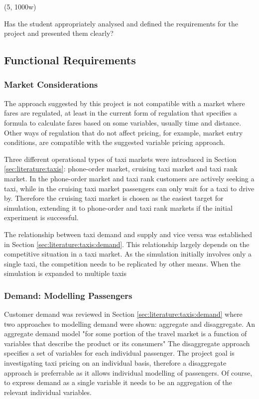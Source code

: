 (5, 1000w)

Has the student appropriately analysed and defined the requirements for the
project and presented them clearly?


\subsection{Functional Requirements}
\label{sec:requirements:simulation}

\subsubsection{Market Considerations}

The approach suggested by this project is not compatible with a market where
fares are regulated, at least in the current form of regulation that specifies
a formula to calculate fares based on some variables, usually time and
distance. Other ways of regulation that do not affect pricing, for example,
market entry conditions, are compatible with the suggested variable pricing
approach.

Three different operational types of taxi markets were introduced in Section
\ref{sec:literature:taxis}: phone-order market, cruising taxi market and taxi
rank market. In the phone-order market and taxi rank customers are actively
seeking a taxi, while in the cruising taxi market passengers can only wait for
a taxi to drive by. Therefore the cruising taxi market is chosen as the easiest
target for simulation, extending it to phone-order and taxi rank markets if the
initial experiment is successful.

The relationship between taxi demand and supply and vice versa was established
in Section \ref{sec:literature:taxis:demand}. This relationship largely depends
on the competitive situation in a taxi market. As the simulation initially
involves only a single taxi, the competition needs to be replicated by other
means. When the simulation is expanded to multiple taxis 


\subsubsection{Demand: Modelling Passengers}
\label{sec:requirements:passenger}

Customer demand was reviewed in Section \ref{sec:literature:taxis:demand} where
two approaches to modelling demand were shown: aggregate and disaggregate. An
aggregate demand model "for some portion of the travel market is a function of
variables that describe the product or its consumers"
\parencite{Small2007taxi+urban} The disaggregate approach specifies a set of
variables for each individual passenger. The project goal is investigating taxi
pricing on an individual basis, therefore a disaggregate approach is
preferrable as it allows individual modelling of passengers.  Of course, to express demand as a single variable it needs
to be an aggregation of the relevant individual variables.

